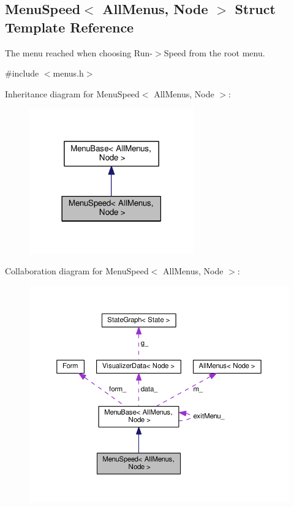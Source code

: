 \hypertarget{structMenuSpeed}{}\subsection{Menu\+Speed$<$ All\+Menus, Node $>$ Struct Template Reference}
\label{structMenuSpeed}


The menu reached when choosing Run-\/$>$Speed from the root menu.  




{\ttfamily \#include $<$menus.\+h$>$}



Inheritance diagram for Menu\+Speed$<$ All\+Menus, Node $>$\+:\nopagebreak
\begin{figure}[H]
\begin{center}
\leavevmode
\includegraphics[width=201pt]{structMenuSpeed__inherit__graph}
\end{center}
\end{figure}


Collaboration diagram for Menu\+Speed$<$ All\+Menus, Node $>$\+:\nopagebreak
\begin{figure}[H]
\begin{center}
\leavevmode
\includegraphics[width=350pt]{structMenuSpeed__coll__graph}
\end{center}
\end{figure}
